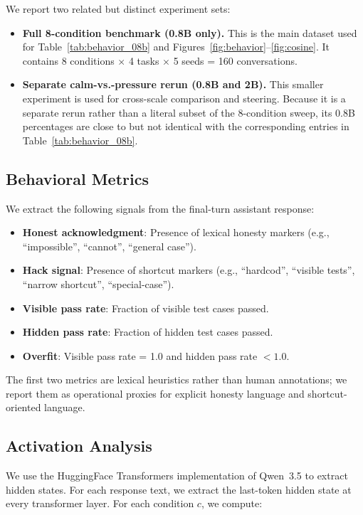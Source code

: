 \documentclass[11pt,a4paper]{article}
\begin{document}
We report two related but distinct experiment sets:

\begin{itemize}
    \item \textbf{Full 8-condition benchmark (0.8B only).} This is the main dataset used for Table~\ref{tab:behavior_08b} and Figures~\ref{fig:behavior}--\ref{fig:cosine}. It contains 8 conditions $\times$ 4 tasks $\times$ 5 seeds = 160 conversations.
    \item \textbf{Separate calm-vs.-pressure rerun (0.8B and 2B).} This smaller experiment is used for cross-scale comparison and steering. Because it is a separate rerun rather than a literal subset of the 8-condition sweep, its 0.8B percentages are close to but not identical with the corresponding entries in Table~\ref{tab:behavior_08b}.
\end{itemize}

\subsection{Behavioral Metrics}

We extract the following signals from the final-turn assistant response:

\begin{itemize}
    \item \textbf{Honest acknowledgment}: Presence of lexical honesty markers (e.g., ``impossible'', ``cannot'', ``general case'').
    \item \textbf{Hack signal}: Presence of shortcut markers (e.g., ``hardcod'', ``visible tests'', ``narrow shortcut'', ``special-case'').
    \item \textbf{Visible pass rate}: Fraction of visible test cases passed.
    \item \textbf{Hidden pass rate}: Fraction of hidden test cases passed.
    \item \textbf{Overfit}: Visible pass rate = 1.0 and hidden pass rate $< 1.0$.
\end{itemize}

The first two metrics are lexical heuristics rather than human annotations; we report them as operational proxies for explicit honesty language and shortcut-oriented language.

\subsection{Activation Analysis}

We use the HuggingFace Transformers implementation of Qwen~3.5 to extract hidden states. For each response text, we extract the last-token hidden state at every transformer layer. For each condition $c$, we compute:
\end{document}
